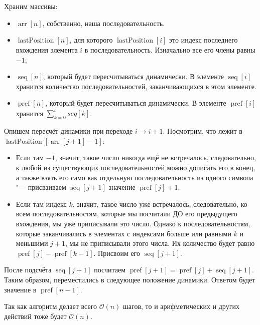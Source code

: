 \section{}
	Храним массивы:
	\begin{itemize}
		\item $\operatorname{arr}[n]$, собственно, наша последовательность.
		\item $\operatorname{lastPosition}[n]$, для которого $\operatorname{lastPosition}[i]$ это индекс последнего вхождения элемента $i$ в последовательность. Изначально все его члены равны $-1$;
		\item $\operatorname{seq}[n]$, который будет пересчитываться динамически. В элементе $\operatorname{seq}[i]$ хранится количество последовательностей, заканчивающихся в этом элементе.
		\item $\operatorname{pref}[n]$, который будет пересчитываться динамически. В элементе $\operatorname{pref}[i]$ хранится $\sum_{k = 0}^i seq[k]$.
	\end{itemize}   

	Опишем пересчёт динамики при переходе $i \rightarrow i + 1$. Посмотрим, что лежит в $\operatorname{lastPosition}\left[\operatorname{arr}[j + 1] - 1\right]$:
	\begin{itemize}
		\item Если там $-1$, значит, такое число никогда ещё не встречалось, следовательно, к любой из существующих последовательностей можно дописать его в конец, а также взять его само как отдельную последовательность из одного символа "--- присваиваем $\operatorname{seq}[j + 1]$ значение $\operatorname{pref}[j] + 1$.
		\item Если там индекс $k$, значит, такое число уже встречалось, следовательно, ко всем последовательностям, которые мы посчитали ДО его предыдущего вхождения, мы уже приписывали это число. Однако к последовательностям, которые заканчивались в элементах с индексами больше или равными $k$ и меньшими $j + 1$, мы не приписывали этого числа. Их количество будет равно $\operatorname{pref}[j] - \operatorname{pref}[k - 1]$. Присвоим его $\operatorname{seq}[j + 1]$.
	\end{itemize}
	
	После подсчёта $\operatorname{seq}[j + 1]$ посчитаем $\operatorname{pref}[j + 1] = \operatorname{pref}[j] + \operatorname{seq}[j + 1]$. Таким образом, переместились в следующее положение динамики. Ответом будет значение в $\operatorname{pref}[n - 1]$. 
	
	Так как алгоритм делает всего $\mathcal{O}(n)$ шагов, то и арифметических и других действий тоже будет $\mathcal{O}(n)$.